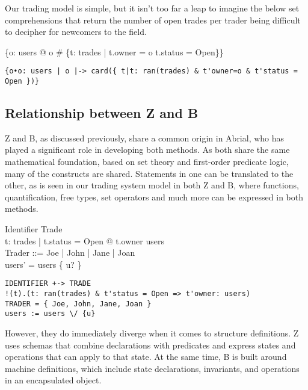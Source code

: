 \documentclass{article}
\begin{document}
\hspace{-0.68cm} Our trading model is simple, but it isn’t too far a leap to imagine the below set comprehensions that return the number of open trades per trader being difficult to decipher for newcomers to the field. 

\begin{zed}
\{o: users @ o \mapsto \# \{t: \ran trades | t.owner = o \land t.status = Open\}\}
\end{zed}

\begin{verbatim}
{o•o: users | o |-> card({ t|t: ran(trades) & t'owner=o & t'status = Open })}
\end{verbatim}

\pagebreak
\subsection*{Relationship between Z and B}

Z and B, as discussed previously, share a common origin in Abrial, who has played a significant role in developing both methods. As both share the same mathematical foundation, based on set theory and first-order predicate logic, many of the constructs are shared. Statements in one can be translated to the other, as is seen in our trading system model in both Z and B, where functions, quantification, free types, set operators and much more can be expressed in both methods. 
\begin{zed}
Identifier \pfun Trade \\
\forall t: \ran trades | t.status = Open @ t.owner \in users \\
Trader ::= Joe | John | Jane | Joan  \\
users' = users \setminus \{ u? \} \\
\end{zed}

\begin{verbatim}
IDENTIFIER +-> TRADE
!(t).(t: ran(trades) & t'status = Open => t'owner: users)
TRADER = { Joe, John, Jane, Joan }
users := users \/ {u}
\end{verbatim}

\hspace{-0.68cm} However, they do immediately diverge when it comes to structure definitions. Z uses schemas that combine declarations with predicates and express states and operations that can apply to that state. At the same time, B is built around machine definitions, which include state declarations, invariants, and operations in an encapsulated object.
\end{document}
